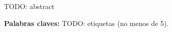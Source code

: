 \chapter*{\runtitulo}

\noindent TODO: abstract

\bigskip

\noindent\textbf{Palabras claves:} TODO: etiquetas (no menos de 5).